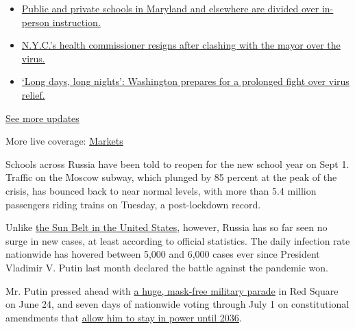 \begin{itemize}
\tightlist
\item
  \href{https://www.nytimes.com/2020/08/04/world/coronavirus-cases.html?action=click\&pgtype=Article\&state=default\&region=MAIN_CONTENT_1\&context=storylines_live_updates\#link-4825b93}{Public
  and private schools in Maryland and elsewhere are divided over
  in-person instruction.}
\item
  \href{https://www.nytimes.com/2020/08/04/world/coronavirus-cases.html?action=click\&pgtype=Article\&state=default\&region=MAIN_CONTENT_1\&context=storylines_live_updates\#link-4d1eafa8}{N.Y.C.'s
  health commissioner resigns after clashing with the mayor over the
  virus.}
\item
  \href{https://www.nytimes.com/2020/08/04/world/coronavirus-cases.html?action=click\&pgtype=Article\&state=default\&region=MAIN_CONTENT_1\&context=storylines_live_updates\#link-6b644638}{`Long
  days, long nights': Washington prepares for a prolonged fight over
  virus relief.}
\end{itemize}

\href{https://www.nytimes.com/2020/08/04/world/coronavirus-cases.html?action=click\&pgtype=Article\&state=default\&region=MAIN_CONTENT_1\&context=storylines_live_updates}{See
more updates}

More live coverage:
\href{https://www.nytimes.com/live/2020/08/04/business/stock-market-today-coronavirus?action=click\&pgtype=Article\&state=default\&region=MAIN_CONTENT_1\&context=storylines_live_updates}{Markets}

Schools across Russia have been told to reopen for the new school year
on Sept 1. Traffic on the Moscow subway, which plunged by 85 percent at
the peak of the crisis, has bounced back to near normal levels, with
more than 5.4 million passengers riding trains on Tuesday, a
post-lockdown record.

Unlike
\href{https://www.nytimes.com/2020/06/14/us/coronavirus-united-states.html}{the
Sun Belt in the United States}, however, Russia has so far seen no surge
in new cases, at least according to official statistics. The daily
infection rate nationwide has hovered between 5,000 and 6,000 cases ever
since President Vladimir V. Putin last month declared the battle against
the pandemic won.

Mr. Putin pressed ahead with
\href{https://www.nytimes.com/2020/06/24/world/europe/russia-coronavirus-parade.html}{a
huge, mask-free military parade} in Red Square on June 24, and seven
days of nationwide voting through July 1 on constitutional amendments
that
\href{https://www.nytimes.com/2020/07/01/world/europe/putin-referendum-vote-russia.html}{allow
him to stay in power until 2036}.

